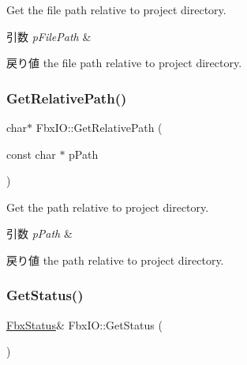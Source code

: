 Get the file path relative to project directory. 
\begin{DoxyParams}{引数}
{\em p\+File\+Path} & \\
\hline
\end{DoxyParams}
\begin{DoxyReturn}{戻り値}
the file path relative to project directory. 
\end{DoxyReturn}
\mbox{\label{class_fbx_i_o_a2b7384d5acf077a30157e844ceaf307a}} 
\subsubsection{\texorpdfstring{Get\+Relative\+Path()}{GetRelativePath()}}
{\footnotesize\ttfamily char$\ast$ Fbx\+I\+O\+::\+Get\+Relative\+Path (\begin{DoxyParamCaption}\item[{const char $\ast$}]{p\+Path }\end{DoxyParamCaption})}

Get the path relative to project directory. 
\begin{DoxyParams}{引数}
{\em p\+Path} & \\
\hline
\end{DoxyParams}
\begin{DoxyReturn}{戻り値}
the path relative to project directory. 
\end{DoxyReturn}
\mbox{\label{class_fbx_i_o_a26f7bc52b2e648a47a463b95287990b6}} 
\subsubsection{\texorpdfstring{Get\+Status()}{GetStatus()}}
{\footnotesize\ttfamily \hyperlink{class_fbx_status}{Fbx\+Status}\& Fbx\+I\+O\+::\+Get\+Status (\begin{DoxyParamCaption}{ }\end{DoxyParamCaption})}

\mbox{\label{class_fbx_i_o_a1ee478c9c4f1f7e1c2e9b635a52f446a}} 
